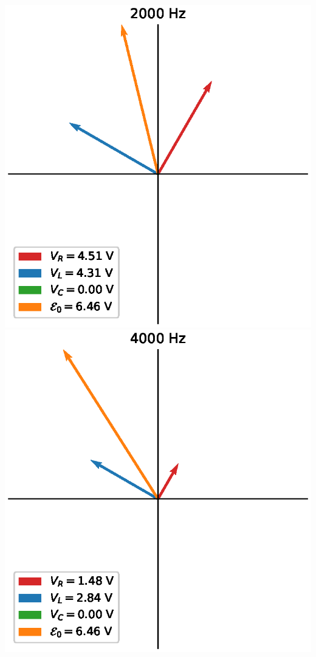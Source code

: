 \documentclass[12pt]{iopart} %
\begin{document}
\includegraphics{media/part_2_2000_hz.eps}
\includegraphics{media/part_2_4000_hz.eps}
\end{document}
